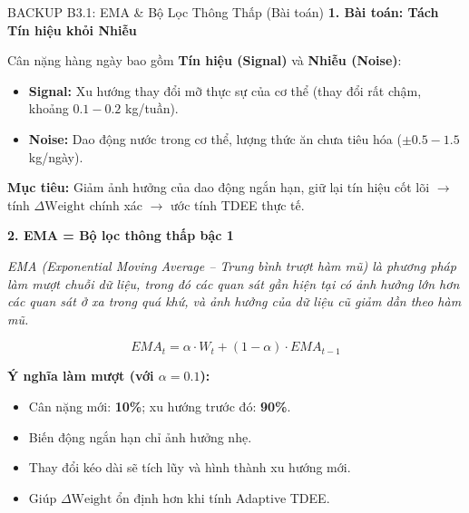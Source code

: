 \documentclass[10pt, aspectratio=169]{beamer}
\begin{document}
\begin{frame}[label=b3_1]{BACKUP B3.1: EMA \& Bộ Lọc Thông Thấp (Bài toán)}
\hypertarget{b3_1_target}{}
    \textbf{1. Bài toán: Tách Tín hiệu khỏi Nhiễu}
    \vspace{0.1cm}
    
    \small Cân nặng hàng ngày bao gồm \textbf{Tín hiệu (Signal)} và \textbf{Nhiễu (Noise)}:
    \begin{itemize}
        \item \textbf{Signal:} Xu hướng thay đổi mỡ thực sự của cơ thể (thay đổi rất chậm, khoảng $0.1 - 0.2$ kg/tuần).
        \item \textbf{Noise:} Dao động nước trong cơ thể, lượng thức ăn chưa tiêu hóa ($\pm 0.5 - 1.5$ kg/ngày).
    \end{itemize}
    
    \textbf{Mục tiêu:} Giảm ảnh hưởng của dao động ngắn hạn, giữ lại tín hiệu cốt lõi $\rightarrow$ tính $\Delta\text{Weight}$ chính xác $\rightarrow$ ước tính TDEE thực tế.
    
    \vspace{0.1cm}
    \normalsize \textbf{2. EMA = Bộ lọc thông thấp bậc 1}
    
    \footnotesize \textit{EMA (Exponential Moving Average – Trung bình trượt hàm mũ) là phương pháp làm mượt chuỗi dữ liệu, trong đó các quan sát gần hiện tại có ảnh hưởng lớn hơn các quan sát ở xa trong quá khứ, và ảnh hưởng của dữ liệu cũ giảm dần theo hàm mũ.}
    
    \vspace{-0.1cm}
    $$ EMA_t = \alpha \cdot W_t + (1 - \alpha) \cdot EMA_{t-1} $$
    \vspace{-0.1cm}
    
    \normalsize \textbf{Ý nghĩa làm mượt (với $\alpha = 0.1$):}
    \begin{itemize}
        \small
        \item Cân nặng mới: \textbf{10\%}; xu hướng trước đó: \textbf{90\%}.
        \item Biến động ngắn hạn chỉ ảnh hưởng nhẹ.
        \item Thay đổi kéo dài sẽ tích lũy và hình thành xu hướng mới.
        \item Giúp $\Delta\text{Weight}$ ổn định hơn khi tính Adaptive TDEE.
    \end{itemize}
\end{frame}
\end{document}
